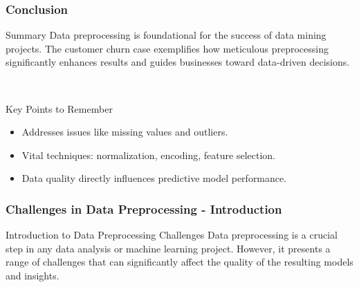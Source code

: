 \documentclass[aspectratio=169]{beamer}
\begin{document}
\begin{frame}[fragile]
    \frametitle{Conclusion}
    \begin{block}{Summary}
        Data preprocessing is foundational for the success of data mining projects. The customer churn case exemplifies how meticulous preprocessing significantly enhances results and guides businesses toward data-driven decisions.
    \end{block}
\    \begin{block}{Key Points to Remember}
        \begin{itemize}
            \item Addresses issues like missing values and outliers.
            \item Vital techniques: normalization, encoding, feature selection.
            \item Data quality directly influences predictive model performance.
        \end{itemize}
    \end{block}
\end{frame}

\begin{frame}[fragile]
    \frametitle{Challenges in Data Preprocessing - Introduction}
    \begin{block}{Introduction to Data Preprocessing Challenges}
        Data preprocessing is a crucial step in any data analysis or machine learning project. However, it presents a range of challenges that can significantly affect the quality of the resulting models and insights.
    \end{block}
\end{frame}
\end{document}
